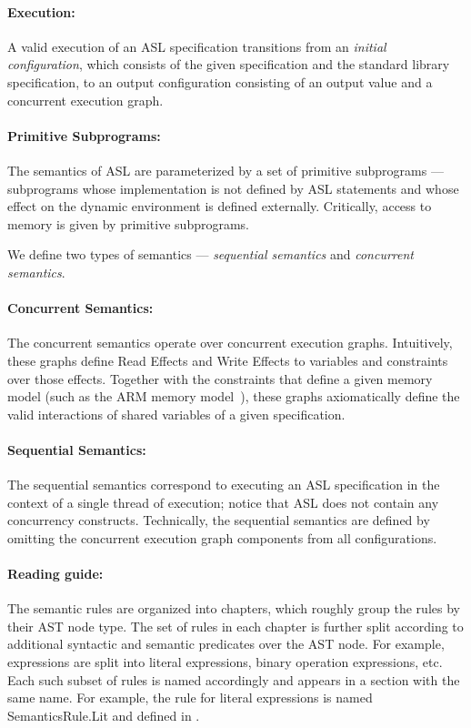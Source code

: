 \documentclass{book}
\begin{document}
\paragraph{Execution:}
A valid execution of an ASL specification transitions from an \emph{initial configuration},
which consists of the given specification and the standard library specification, to an output configuration
consisting of an output value and a concurrent execution graph.

\paragraph{Primitive Subprograms:}
The semantics of ASL are parameterized by a set of primitive subprograms ---
subprograms whose implementation is not defined by ASL statements and whose effect on the dynamic environment
is defined externally. Critically, access to memory is given by primitive subprograms.

We define two types of semantics --- \emph{sequential semantics} and \emph{concurrent semantics}.

\paragraph{Concurrent Semantics:}
The concurrent semantics operate over concurrent execution graphs.
Intuitively, these graphs define Read Effects and Write Effects to variables and constraints over those effects.
Together with the constraints that define a given memory model (such as the ARM memory model~\cite{AlglaveDGHM21}),
these graphs axiomatically define
the valid interactions of shared variables of a given specification.

\paragraph{Sequential Semantics:}
The sequential semantics correspond to executing an ASL specification in the context of a single thread
of execution; notice that ASL does not contain any concurrency constructs.
%
Technically, the sequential semantics are defined by omitting the concurrent execution graph components
from all configurations.

\paragraph{Reading guide:}
The semantic rules are organized into chapters, which roughly group the rules
by their AST node type.  The set of rules in each chapter is further split
according to additional syntactic and semantic predicates over the AST node.
For example, expressions are split into literal expressions, binary operation
expressions, etc.  Each such subset of rules is named accordingly and appears
in a section with the same name.  For example, the rule for literal expressions
is named SemanticsRule.Lit and defined in .
\end{document}
